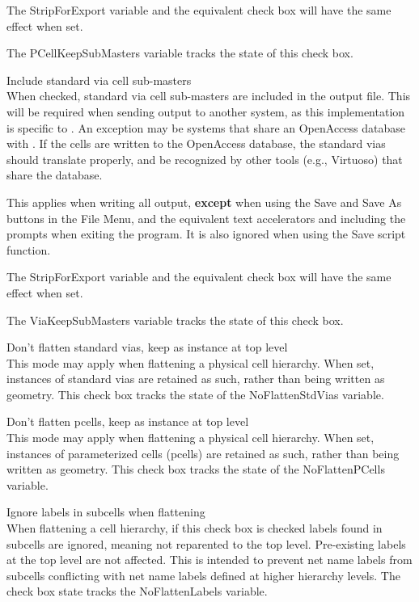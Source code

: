 \begin{description}
The {\et StripForExport} variable and the equivalent check box will
have the same effect when set.

The {\et PCellKeepSubMasters} variable tracks the state of this check
box.

\item{\cb Include standard via cell sub-masters}\\
When checked, standard via cell sub-masters are included in the output
file.  This will be required when sending output to another system, as
this implementation is specific to {\Xic}.
An exception may be systems that share an OpenAccess database with
{\Xic}.  If the cells are written to the OpenAccess database, the
standard vias should translate properly, and be recognized by other
tools (e.g., Virtuoso) that share the database.

This applies when writing all output, {\bf except} when using the {\cb
Save} and {\cb Save As} buttons in the {\cb File Menu}, and the
equivalent text accelerators and including the prompts when exiting
the program.  It is also ignored when using the {\vt Save} script
function.

The {\et StripForExport} variable and the equivalent check box will
have the same effect when set.

The {\et ViaKeepSubMasters} variable tracks the state of this check
box.

\item{\cb Don't flatten standard vias, keep as instance at top level}\\
This mode may apply when flattening a physical cell hierarchy.  When
set, instances of standard vias are retained as such, rather than
being written as geometry.  This check box tracks the state of the
{\et NoFlattenStdVias} variable.

\item{\cb Don't flatten pcells, keep as instance at top level}\\
This mode may apply when flattening a physical cell hierarchy.  When
set, instances of parameterized cells (pcells) are retained as such,
rather than being written as geometry.  This check box tracks the
state of the {\et NoFlattenPCells} variable.

\item{\cb Ignore labels in subcells when flattening}\\
When flattening a cell hierarchy, if this check box is checked labels
found in subcells are ignored, meaning not reparented to the top
level.  Pre-existing labels at the top level are not affected.  This
is intended to prevent net name labels from subcells conflicting with
net name labels defined at higher hierarchy levels.  The check box
state tracks the {\et NoFlattenLabels} variable.


\end{description}
